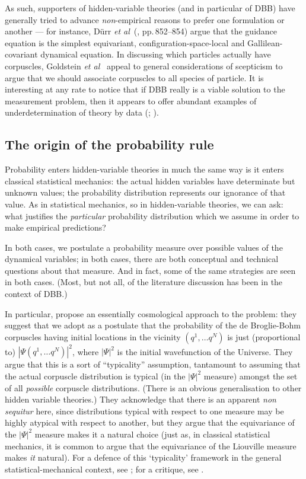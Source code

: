 \documentclass[12pt]{article}
\begin{document}
As such, supporters of hidden-variable theories (and in particular of DBB) have generally tried to advance \emph{non}-empirical reasons to prefer one formulation or another --- for instance, D\"{u}rr \emph{et al}~(, pp.\,852--854) argue that the guidance equation is the simplest equivariant, configuration-space-local and Gallilean-covariant dynamical equation. In discussing which particles actually have corpuscles, Goldstein \emph{et al}~\citeyear{goldstein05} appeal to general considerations of scepticism to argue that we should associate corpuscles to all species of particle. It is interesting at any rate to notice that if DBB really is a viable solution to the measurement problem, then it appears to offer abundant examples of underdetermination of theory by data (; ).

\subsection{The origin of the probability rule}\label{DMWWHVTprob}

Probability enters hidden-variable theories in much the same way is it enters classical statistical mechanics: the actual hidden variables have determinate but unknown values; the probability distribution represents our ignorance of that value. As in statistical mechanics, so in hidden-variable theories, we can ask: what justifies the \emph{particular} probability distribution which we assume in order to make empirical predictions? 

In both cases, we postulate a probability measure over possible values of the dynamical variables; in both cases, there are both conceptual and technical questions about that measure. And in fact, some of the same strategies are seen in both cases. (Most, but not all, of the literature discussion has been in the context of DBB.)

In particular,  propose an essentially cosmological approach to the problem: they suggest that we adopt as a postulate that the probability of the  de Broglie-Bohm corpuscles having initial locations in the vicinity $(q^1, \ldots q^N)$ is just (proportional to) $|\Psi(q^1,\ldots q^N)|^2$, where $|\Psi|^2$ is the initial wavefunction of the Universe. They argue that this is a sort of ``typicality'' assumption, tantamount to assuming that the actual corpuscle distribution is typical (in the $|\Psi|^2$ measure)  amongst the set of all \emph{possible} corpuscle distributions. (There is an obvious generalisation to other hidden variable theories.) They acknowledge that there is an apparent \emph{non sequitur} here, since distributions typical with respect to one measure may be highly atypical with respect to another, but they argue that the equivariance of the $|\Psi|^2$ measure makes it a natural choice (just as, in classical statistical mechanics, it is common to argue that the equivariance of the Liouville measure makes \emph{it} natural). For a defence of this `typicality' framework in the general statistical-mechanical context, see ; for a critique, see .
\end{document}
